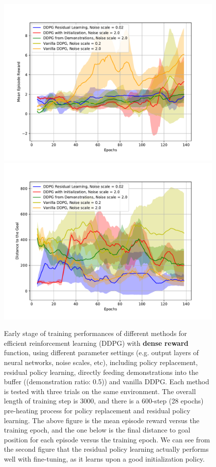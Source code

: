 \documentclass{article}
\begin{document}
\begin{figure}[H]
	\centering
	\includegraphics[scale=0.5]{img/3000step31.pdf}
	\includegraphics[scale=0.5]{img/3000step41.pdf}
	\caption{Early stage of training performances of different methods for efficient reinforcement learning (DDPG) with \textbf{dense reward} function, using different parameter settings (e.g. output layers of neural networks, noise scales, etc), including policy replacement, residual policy learning, directly feeding demonstrations into the buffer ((demonstration ratio: 0.5)) and vanilla DDPG. Each method is tested with three trials on the same environment. The overall length of training step is 3000, and there is a 600-step (28 epochs) pre-heating process for policy replacement and residual policy learning. The above figure is the mean episode reward versus the training epoch, and the one below is the final distance to goal position for each episode versus the training epoch. We can see from the second figure that the residual policy learning actually performs well with fine-tuning, as it learns upon a good initialization policy.}
	\label{fig:comparion4}
\end{figure}
\end{document}
